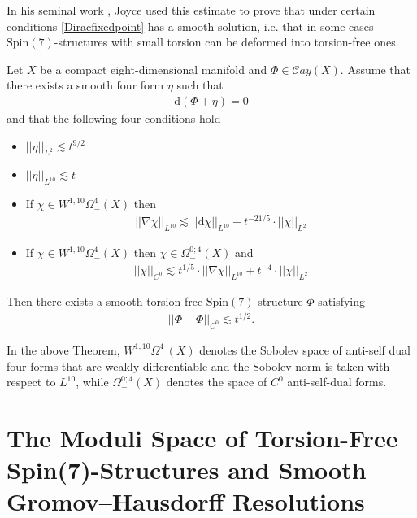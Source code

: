 \documentclass[psamsfonts]{amsart}
\theoremstyle{plain}
\theoremstyle{definition}{
\newtheorem{defi}{Definition}[section]
\newtheorem{ass}{Assumption}
\newtheorem*{nota}{Notation}}
\theoremstyle{remark}{
\newtheorem{rem}{Remark}
\newtheorem{ex}{Example}}
\theoremstyle{plain}{
\newtheorem{thm}{Theorem}[section]
\newtheorem{lem}{Lemma}[section]
\newtheorem{cor}{Corollary}[section]
\newtheorem{prop}{Proposition}[section]
\newtheorem{con}{Conjecture}[section]}
\newcommand{\m}[1]{{\mathrm{#1}}}
\begin{document}
In his seminal work \cite{Joyce1996b}, Joyce used this estimate to prove that under certain conditions \eqref{Diracfixedpoint} has a smooth solution, i.e. that in some cases $\m{Spin}(7)$-structures with small torsion can be deformed into torsion-free ones.

\begin{thm}\cite[Thm. A]{Joyce1996b}
Let $X$ be a compact eight-dimensional manifold and $\Phi\in\mathcal{C}ay(X)$. Assume that there exists a smooth four form $\eta$ such that 
\begin{align*}
    \m{d}(\Phi+\eta)=0
\end{align*}
and that the following four conditions hold
\begin{itemize}
    \item $\left|\left|\eta\right|\right|_{L^2}\lesssim t^{9/2}$
    \item $\left|\left|\eta\right|\right|_{L^{10}}\lesssim t$
    \item If ${\chi}\in W^{1,10}\Omega^4_-(X)$ then
    \begin{align*}
        \left|\left|\nabla{\chi}\right|\right|_{L^{10}}\lesssim\left|\left|\m{d}{\chi}\right|\right|_{L^{10}}+t^{-21/5}\cdot\left|\left|{\chi}\right|\right|_{L^2}
    \end{align*}
    \item If ${\chi}\in W^{1,10}\Omega^4_-(X)$ then ${\chi}\in\Omega^{0;4}_-(X)$ and
    \begin{align*}
        \left|\left|{\chi}\right|\right|_{C^0}\lesssim t^{1/5}\cdot\left|\left|\nabla{\chi}\right|\right|_{L^{10}}+t^{-4}\cdot\left|\left|{\chi}\right|\right|_{L^2}
    \end{align*}
\end{itemize}
Then there exists a smooth torsion-free $\m{Spin}(7)$-structure $\Phi$ satisfying
\begin{align*}
\left|\left|\Phi-\Phi\right|\right|_{C^0}\lesssim t^{1/2}. 
\end{align*}
\end{thm}

In the above Theorem, $W^{1,10}\Omega^4_-(X)$ denotes the Sobolev space of anti-self dual four forms that are weakly differentiable and the Sobolev norm is taken with respect to $L^{10}$, while $\Omega^{0;4}_-(X)$ denotes the space of $C^0$ anti-self-dual forms.


\section{The Moduli Space of Torsion-Free Spin(7)-Structures and Smooth Gromov--Hausdorff Resolutions}
\label{The Moduli Space of Torsion-Free Spin(7)-Structures and Smooth Gromov--Hausdorff Resolutions}
\end{document}
